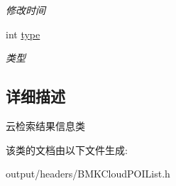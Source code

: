 \begin{DoxyCompactItemize}
\begin{DoxyCompactList}\small\item\em 修改时间 \end{DoxyCompactList}\item 
\hypertarget{interface_b_m_k_cloud_p_o_i_info_a7a51645c4ec8dcfa08ae4624749878cb}{}int \hyperlink{interface_b_m_k_cloud_p_o_i_info_a7a51645c4ec8dcfa08ae4624749878cb}{type}\label{interface_b_m_k_cloud_p_o_i_info_a7a51645c4ec8dcfa08ae4624749878cb}

\begin{DoxyCompactList}\small\item\em 类型 \end{DoxyCompactList}\end{DoxyCompactItemize}


\subsection{详细描述}
云检索结果信息类 

该类的文档由以下文件生成\+:\begin{DoxyCompactItemize}
\item 
output/headers/B\+M\+K\+Cloud\+P\+O\+I\+List.\+h\end{DoxyCompactItemize}
